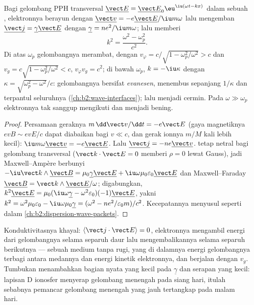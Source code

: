 \begin{theorem}\label{thm:b2:waves-in-media:plasmadispersion}
Bagi gelombang PPH transversal $\underline{\vect E} = \underline{\vect E}_0\eu^{\iu(\omega t - kx)}$ dalam
sebuah , elektronnya berayun dengan $\underline{\vect v} = -e\underline{\vect E}/\iu m\omega$
lalu mengemban  $\underline{\vect j} = \underline\gamma\underline{\vect E}$ dengan
$\underline\gamma = ne^2/\iu m\omega$;  lalu memberi
\[
k^2 = \frac{\omega^2 - \omega_p^2}{c^2} .
\]
Di atas $\omega_p$ gelombangnya merambat, dengan $v_\varphi = c/\sqrt{1 - \omega_p^2/\omega^2}
> c$ dan $v_g = c\sqrt{1 - \omega_p^2/\omega^2} < c$, $v_\varphi v_g = c^2$; di bawah
$\omega_p$, $k = -\iu\kappa$ dengan $\kappa = \sqrt{\omega_p^2 - \omega^2}/c$: gelombangnya bersifat
\emph{evanesen}, menembus sepanjang $1/\kappa$ dan terpantul seluruhnya
(\cref{ch:b2:wave-interfaces});  lalu menjadi cermin. Pada $\omega
\gg \omega_p$ elektronnya tak sanggup mengikuti dan  menjadi bening.
\end{theorem}

\begin{proof}
Persamaan geraknya $m\,\dd\vect v/\dd t = -e\vect E$ (gaya magnetiknya
$ev B \sim evE/c$ dapat diabaikan bagi $v \ll c$, dan gerak ionnya
$m/M$ kali lebih kecil): $\iu m\omega\underline{\vect v} = -e\underline{\vect E}$. Lalu
$\underline{\vect j} = -ne\underline{\vect v}$.  tetap netral bagi
gelombang transversal ($\vect k\cdot\vect E = 0$ memberi $\rho = 0$ lewat Gauss), jadi
Maxwell--Ampère berbunyi $-\iu\vect k\wedge\underline{\vect B} = \mu_0\underline\gamma\underline{\vect E}
+ \iu\omega\mu_0\varepsilon_0\underline{\vect E}$ dan Maxwell--Faraday $\underline{\vect B} = \vect k
\wedge\underline{\vect E}/\omega$; digabungkan, $k^2\underline{\vect E} = \mu_0(\iu\omega\underline\gamma -
\omega^2\varepsilon_0)(-1)\underline{\vect E}$, yakni $k^2 = \omega^2\mu_0\varepsilon_0 - \iu\omega\mu_0
\underline\gamma = (\omega^2 - ne^2/\varepsilon_0m)/c^2$. Kecepatannya menyusul seperti dalam
\cref{ch:b2:dispersion-wave-packets}.
\end{proof}

\begin{remark}\label{rem:b2:waves-in-media:plasmaenergy}
Konduktivitasnya khayal: $\langle\vect j\cdot\vect E\rangle = 0$,
elektronnya mengambil energi dari gelombangnya selama separuh daur lalu mengembalikannya
selama separuh berikutnya --- sebuah medium tanpa rugi, yang di dalamnya energi gelombangnya
terbagi antara medannya dan energi kinetik elektronnya, dan
berjalan dengan $v_g$. Tumbukan menambahkan bagian nyata yang kecil pada $\underline\gamma$ dan
serapan yang kecil: lapisan D ionosfer menyerap gelombang menengah pada
siang hari, itulah sebabnya pemancar gelombang menengah yang jauh tertangkap pada malam hari.
\end{remark}

